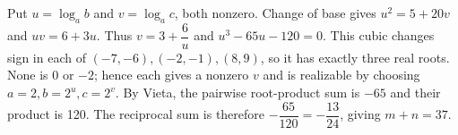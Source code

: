 Put $u=\log_ab$ and $v=\log_ac$, both nonzero. Change of base gives $u^2=5+20v$ and $uv=6+3u$. Thus $v=3+\dfrac{6}{u}$ and $u^3-65u-120=0$. This cubic changes sign in each of $(-7,-6),(-2,-1),(8,9)$, so it has exactly three real roots. None is 0 or $-2$; hence each gives a nonzero $v$ and is realizable by choosing $a=2,b=2^u,c=2^v$. By Vieta, the pairwise root-product sum is $-65$ and their product is 120. The reciprocal sum is therefore $-\dfrac{65}{120}=-\dfrac{13}{24}$, giving $\boxed{m+n=37}$.
